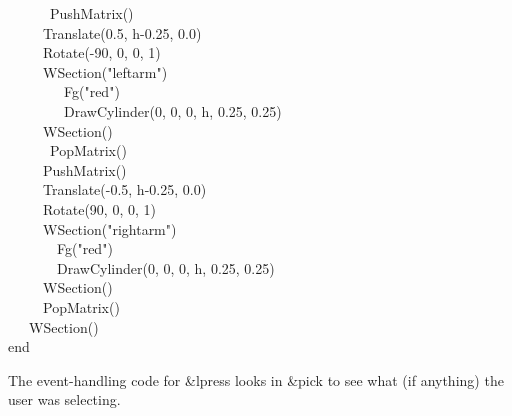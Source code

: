 \documentclass[letterpaper]{article}
\begin{document}
{{\ \ \ \ \ \ PushMatrix() \\
\ \ \ \ \  Translate(0.5, h-0.25, 0.0) \\
\ \ \ \ \  Rotate(-90, 0, 0, 1) \\
\ \ \ \ \  WSection("leftarm") \\
\ \ \ \ \  \ \ \ Fg("red") \\
\ \ \ \ \  \ \ \ DrawCylinder(0, 0, 0, h, 0.25, 0.25) \\
\ \ \ \ \  WSection() \\
\ \ \ \ \ \ PopMatrix() \\
\ \ \ \ \ PushMatrix() \\
\ \ \ \ \ Translate(-0.5, h-0.25, 0.0) \\
\ \ \ \ \ Rotate(90, 0, 0, 1) \\
\ \ \ \ \ WSection("rightarm") \\
\ \ \ \ \  \ \ Fg("red") \\
\ \ \ \ \  \ \ DrawCylinder(0, 0, 0, h, 0.25, 0.25) \\
\ \ \ \ \ WSection() \\
\ \ \ \ \ PopMatrix() \\
\ \ \ WSection() \\
end
}


\bigskip

The event-handling code for \textsf{\&lpress} looks in \textsf{\&pick}
to see what (if anything) the user was selecting.

\bigskip



}
\end{document}
